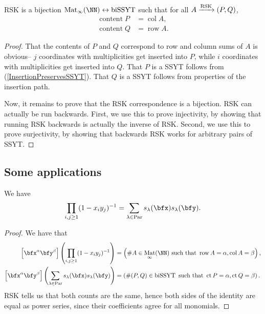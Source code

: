 \documentclass{article}
\DeclareMathOperator{\RSK}{RSK}
\DeclareMathOperator{\row}{row}
\DeclareMathOperator{\col}{col}
\DeclareMathOperator{\content}{content}
\DeclareMathOperator{\ct}{ct}
\DeclareMathOperator{\Par}{Par}
\DeclareMathOperator{\biSSYT}{biSSYT}
\DeclareMathOperator{\Mat}{Mat}
\newcommand{\rskarrow}{\ensuremath\xrightarrow{\RSK}}
\begin{document}
\begin{theorem}
    RSK is a bijection $\Mat_\infty(\NN) \leftrightarrow \biSSYT$ such that for all $A \rskarrow (P,Q)$,
    \begin{align*}
        \content P &= \col A, \\
        \content Q &= \row A.
    \end{align*}
\end{theorem}

\begin{proof}
    That the contents of $P$ and $Q$ correspond to row and column sums of $A$ is obvious-- $j$ coordinates with multiplicities get inserted into $P$, while $i$ coordinates with multiplicities get inserted into $Q$.
    That $P$ is a SSYT follows from (\ref{InsertionPreservesSSYT}).
    That $Q$ is a SSYT follows from properties of the insertion path.

    Now, it remains to prove that the RSK correspondence is a bijection. 
    RSK can actually be run backwards. 
    First, we use this to prove injectivity, by showing that running RSK backwards is actually the inverse of RSK. 
    Second, we use this to prove surjectivity, by showing that backwards RSK works for arbitrary pairs of SSYT.

\end{proof}

\subsection{Some applications}


\begin{theorem}    We have
    \begin{equation}\label{eq:CauchyIdentityForSchurs}
        \prod_{i,j \geq 1}(1-x_iy_j)^{-1}
        =
        \sum_{\lambda\in\Par}
        s_\lambda(\bfx)s_\lambda(\bfy).
    \end{equation}
\end{theorem}

\begin{proof}
    We have that
    \begin{align*}
        \left[\bfx^\alpha \bfy^\beta\right]
        \left(
            \prod_{i,j\geq1}(1-x_iy_j)^{-1}
        \right)
        &=
        \left(
            \#A \in \Mat_\infty(\NN) \text{ such that } \row A = \alpha, \col A = \beta
        \right), \\
        \left[\bfx^\alpha \bfy^\beta\right]
        \left(
            \sum_{\lambda\in\Par} 
            s_\lambda(\bfx) s_\lambda(\bfy)
        \right) 
        &= 
        \left(
            \#(P,Q) \in \biSSYT \text{ such that } \ct P = \alpha, \ct Q = \beta
        \right).
    \end{align*}
    RSK tells us that both counts are the same, hence both sides of the identity are equal as power series, since their coefficients agree for all monomials.
\end{proof}
\end{document}
